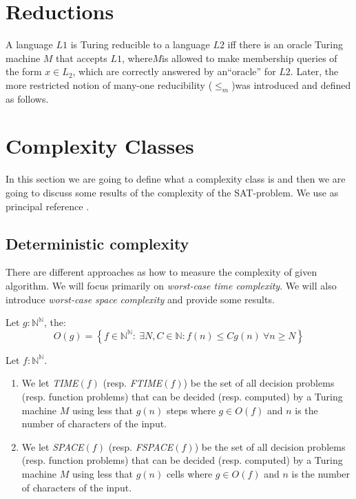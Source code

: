   
\section{Reductions}
A language $L1$ is Turing reducible to a language $L2$ iff there is an oracle Turing machine $M$ that accepts $L1$, where$M$is allowed to make membership queries of the form $x\in L_2$, which are correctly answered by an“oracle” for $L2$. Later, the more restricted notion of many-one reducibility ($\le_m$)was introduced and defined as follows.


\section{Complexity Classes}
\label{sec:complexity}

In this section we are going to define what a complexity class is and then we are going to discuss some results of the complexity of the SAT-problem. We use as principal reference \cite{arora2009computational}.

\subsection{Deterministic complexity}
\label{sub:detcomp}
There are different approaches as how to measure the complexity of given algorithm. We will focus primarily on \emph{worst-case time complexity}. We will also introduce \emph{worst-case space complexity} and provide some results.

\begin{definition}
  Let $g:\mathbb{N}^\mathbb{N}$, the:
  $$O(g) = \left\{ f\in \mathbb{N}^\mathbb{N} :\ \exists N,C \in \mathbb{N} : f(n) \le Cg(n) \ \forall  n \ge N\right\}$$
\end{definition}

\begin{definition}
  Let $f:\mathbb{N}^\mathbb{N}$.
\begin{enumerate}
  \item We let \emph{TIME}$(f)$ (resp. \emph{FTIME}$(f)$) be the set of all decision  problems (resp. function problems) that can be decided (resp. computed) by a Turing machine $M$ using less that $g(n)$ steps where $g\in O(f)$ and $n$ is the number of characters of the input.  
  \item We let \emph{SPACE}$(f)$ (resp. \emph{FSPACE}$(f)$) be the set of all decision problems (resp. function problems) that can be decided (resp. computed) by a Turing machine $M$ using less that $g(n)$ cells where $g\in O(f)$ and $n$ is the number of characters of the input.  
  \end{enumerate}

\end{definition}

